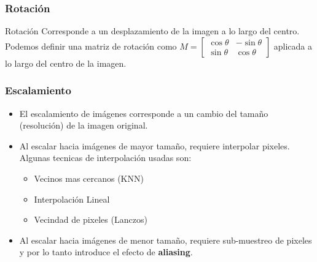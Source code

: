 \documentclass[aspectratio=169, 10pt]{beamer}
\begin{document}
\begin{frame}[fragile]
	\frametitle{Rotación}
	\begin{block}{Rotación}
		Corresponde a un desplazamiento de la imagen a lo largo del centro. Podemos definir una matriz de rotación como $M=\begin{bmatrix}
			\cos{\theta} & -\sin{\theta} \\
			\sin{\theta}& \cos{\theta}
		\end{bmatrix}$ aplicada a lo largo del centro de la imagen.
	\end{block}	
	
	\begin{figure}[h!]
		\centering
		
	\end{figure}
	

\end{frame}

\begin{frame}[fragile]
	\frametitle{Escalamiento}
	\begin{itemize}
		\item El escalamiento de imágenes corresponde a un cambio del tamaño (resolución) de la imagen original.
		\item Al escalar hacia imágenes de mayor tamaño, requiere interpolar pixeles. Algunas tecnicas de interpolación usadas son:
		\begin{itemize}
			\item Vecinos mas cercanos (KNN)
			\item Interpolación Lineal
			\item Vecindad de pixeles (Lanczos)
		\end{itemize}
		\item Al escalar hacia imágenes de menor tamaño, requiere sub-muestreo de pixeles y por lo tanto introduce el efecto de \textbf{aliasing}.
	\end{itemize}	
	
	
\end{frame}
\end{document}
